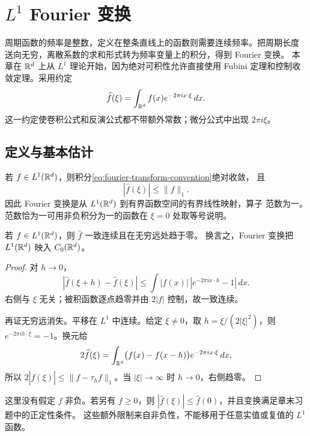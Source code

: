 \chapter{\texorpdfstring{\(L^1\)}{L1} Fourier 变换}
\label{chap:l1-fourier-transform}

周期函数的频率是整数，定义在整条直线上的函数则需要连续频率。把周期长度
送向无穷，离散系数的求和形式转为频率变量上的积分，得到 Fourier 变换。
本章在 \(\mathbb{R}^d\) 上从 \(L^1\) 理论开始，因为绝对可积性允许直接使用 Fubini
定理和控制收敛定理。采用约定
\begin{equation}\label{eq:fourier-transform-convention}
 \widehat f(\xi)=\int_{\mathbb{R}^d}f(x)e^{-2\pi i x\cdot\xi}\,dx.
\end{equation}
这一约定使卷积公式和反演公式都不带额外常数；微分公式中出现 \(2\pi i\xi\)。

\section{定义与基本估计}

若 \(f\in L^1(\mathbb{R}^d)\)，则积分\eqref{eq:fourier-transform-convention}绝对收敛，
且
\begin{equation}\label{eq:fourier-lone-bound}
 |\widehat f(\xi)|\le\|f\|_1.
\end{equation}
因此 Fourier 变换是从 \(L^1(\mathbb{R}^d)\) 到有界函数空间的有界线性映射，算子
范数为一。范数恰为一可用非负积分为一的函数在 \(\xi=0\) 处取等号说明。

\begin{theorem}\label{thm:fourier-lone-continuous-czero}
若 \(f\in L^1(\mathbb{R}^d)\)，则 \(\widehat f\) 一致连续且在无穷远处趋于零。
换言之，Fourier 变换把 \(L^1(\mathbb{R}^d)\) 映入 \(C_0(\mathbb{R}^d)\)。
\end{theorem}
\begin{proof}
对 \(h\to0\)，
\[
 |\widehat f(\xi+h)-\widehat f(\xi)|
 \le\int|f(x)|\,|e^{-2\pi ix\cdot h}-1|\,dx.
\]
右侧与 \(\xi\) 无关；被积函数逐点趋零并由 \(2|f|\) 控制，故一致连续。

再证无穷远消失。平移在 \(L^1\) 中连续。给定 \(\xi\ne0\)，取
\(h=\xi/(2|\xi|^2)\)，则 \(e^{-2\pi ih\cdot\xi}=-1\)。换元给
\[
 2\widehat f(\xi)
 =\int_{\mathbb{R}^d}\bigl(f(x)-f(x-h)\bigr)e^{-2\pi ix\cdot\xi}\,dx,
\]
所以 \(2|\widehat f(\xi)|\le\|f-\tau_hf\|_1\)。当
\(|\xi|\to\infty\) 时 \(h\to0\)，右侧趋零。
\end{proof}

这里没有假定 \(f\) 非负。若另有 \(f\ge0\)，则
\(|\widehat f(\xi)|\le\widehat f(0)\)，并且变换满足章末习题中的正定性条件。
这些额外限制来自非负性，不能移用于任意实值或复值的 \(L^1\) 函数。

